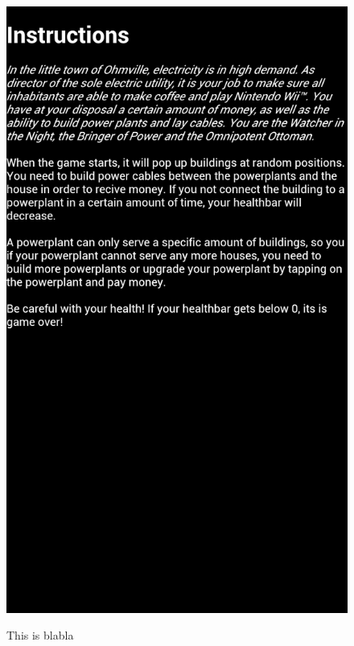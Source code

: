 \begin{figure}[H]
{		\includegraphics[scale=0.17]{pictures/sprint2-screen/sprint2-3}
	}
	\caption{This is blabla}
	\end{figure}

